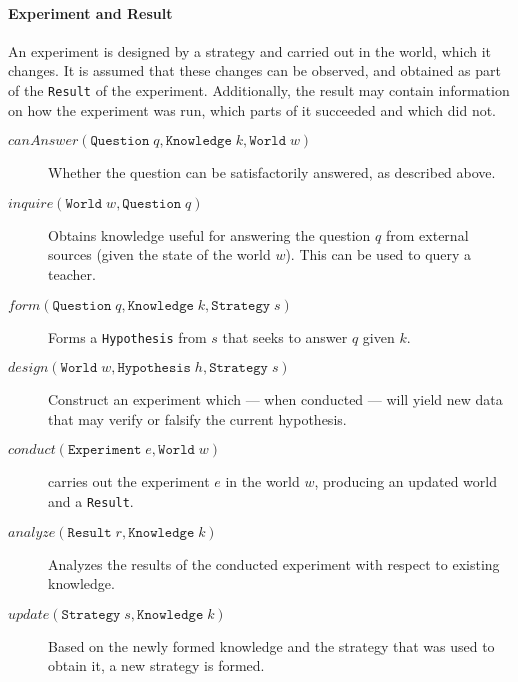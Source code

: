 \documentclass[\master/Master.tex]{subfiles}
\begin{document}
\paragraph*{Experiment and Result}
An experiment is designed by a strategy and carried out in the world, which it changes. It is assumed that these changes can be observed, and obtained as part of the \texttt{Result} of the experiment. Additionally, the result may contain information on how the experiment was run, which parts of it succeeded and which did not.

\begin{description}
    \item[$canAnswer( \texttt{Question} \; q
                    , \texttt{Knowledge} \; k
                    , \texttt{World} \; w
                    )
         $]
        Whether the question can be satisfactorily answered, as described above.

    \item[$inquire( \texttt{World} \; w
                  , \texttt{Question} \; q
                  )
         $]
        Obtains knowledge useful for answering the question $q$ from external sources (given the state of the world $w$). This can be used to query a teacher.

    \item[$form( \texttt{Question} \; q
               , \texttt{Knowledge} \; k
               , \texttt{Strategy} \; s
               )
         $]
        Forms a \texttt{Hypothesis} from $s$ that seeks to answer $q$ given $k$.

    \item[$design( \texttt{World} \; w
                 , \texttt{Hypothesis} \; h
                 , \texttt{Strategy} \; s
                 )
         $]
        Construct an experiment which --- when conducted --- will yield new data that may verify or falsify the current hypothesis.

    \item[$conduct( \texttt{Experiment} \; e
                  , \texttt{World} \; w
                  )
         $]
        carries out the experiment $e$ in the world $w$, producing an updated world and a \texttt{Result}.

    \item[$analyze( \texttt{Result} \; r
                  , \texttt{Knowledge} \; k
                  )
         $]
        Analyzes the results of the conducted experiment with respect to existing knowledge.

    \item[$update( \texttt{Strategy} \; s
                 , \texttt{Knowledge} \; k
                 )
         $]
        Based on the newly formed knowledge and the strategy that was used to obtain it, a new strategy is formed.
\end{description}
\end{document}
